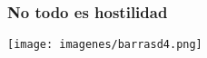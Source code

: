 \documentclass[compress]{beamer}
\begin{document}




{
\begin{frame}
\frametitle{No todo es hostilidad}
\vspace{-1.5cm}

\begin{center}
\hspace*{-1cm}\texttt{[image: imagenes/barrasd4.png]}\\

\end{center}

\end{frame}
}




\end{document}
